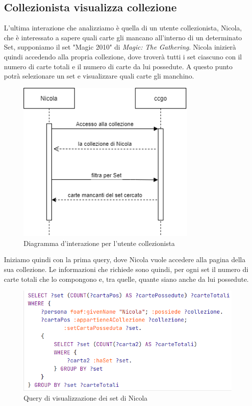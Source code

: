 \documentclass[12pt]{article}
\begin{document}
\subsection{Collezionista visualizza collezione}
L'ultima interazione che analizziamo è quella di un utente collezionista, Nicola, che è interessato a sapere quali carte gli mancano all'interno di un determinato Set, supponiamo il set "Magic 2010" di \textit{Magic: The Gathering}.
Nicola inizierà quindi accedendo alla propria collezione, dove troverà tutti i set ciascuno con il numero di carte totali e il numero di carte da lui possedute. A questo punto potrà selezionare un set e visualizzare quali carte gli manchino.

\begin{figure}[H]
    \centering
    \includegraphics[height=8cm]{files/flowchart_nicola.png}
    \caption{Diagramma d'interazione per l'utente collezionista}
    \label{fig:flowchart_nicola}
\end{figure}

Iniziamo quindi con la prima query, dove Nicola vuole accedere alla pagina della sua collezione. Le informazioni che richiede sono quindi, per ogni set il numero di carte totali che lo compongono e, tra quelle, quante siano anche da lui possedute.

\begin{figure}[H]
    \centering
    \includegraphics[width=13cm]{files/query1_nicola.png}
    \caption{Query di visualizzazione dei set di Nicola}
    \label{fig:query1_nicola}
\end{figure}
\end{document}
